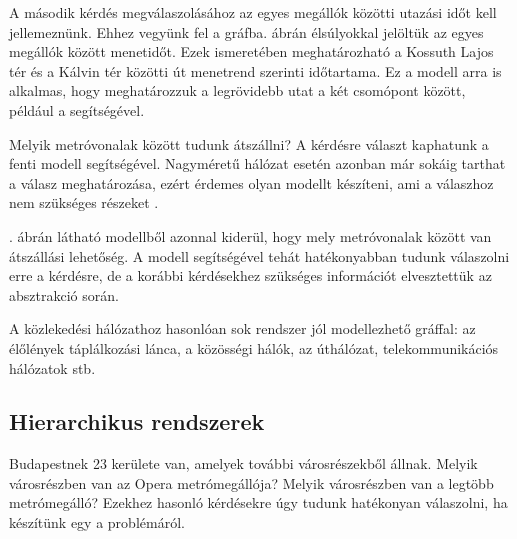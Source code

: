 A második kérdés megválaszolásához az egyes megállók közötti utazási időt kell jellemeznünk. Ehhez vegyünk fel  a gráfba.  ábrán élsúlyokkal jelöltük az egyes megállók között menetidőt. Ezek ismeretében meghatározható a Kossuth Lajos tér és a Kálvin tér közötti út menetrend szerinti időtartama. Ez a modell arra is alkalmas, hogy meghatározzuk a legrövidebb utat a két csomópont között, például a  segítségével.

\begin{pelda}
	Melyik metróvonalak között tudunk átszállni? A kérdésre választ kaphatunk a fenti modell segítségével. Nagyméretű hálózat esetén azonban már sokáig tarthat a válasz meghatározása, ezért érdemes olyan modellt készíteni, ami a válaszhoz nem szükséges részeket .
\end{pelda}


. ábrán látható modellből azonnal kiderül, hogy mely metróvonalak között van átszállási lehetőség. A modell segítségével tehát hatékonyabban tudunk válaszolni erre a kérdésre, de a korábbi kérdésekhez szükséges információt elvesztettük az absztrakció során.

A közlekedési hálózathoz hasonlóan sok rendszer jól modellezhető gráffal: az élőlények táplálkozási lánca, a közösségi hálók, az úthálózat, telekommunikációs hálózatok stb.

\subsection{Hierarchikus rendszerek}
\label{sec:hierarhcikus-rendszerek}

\begin{pelda}
	Budapestnek 23 kerülete van, amelyek további városrészekből állnak. %
	Melyik városrészben van az Opera metrómegállója? Melyik városrészben van a legtöbb metrómegálló? Ezekhez hasonló kérdésekre úgy tudunk hatékonyan válaszolni, ha készítünk egy  a problémáról.
\end{pelda}

